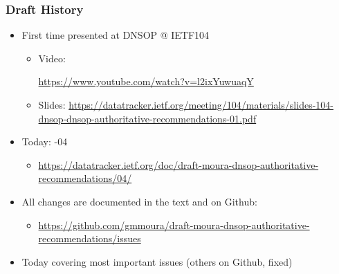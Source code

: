 \documentclass[11pt,show 
notes,notheorems,noamsthm,blank]{beamer} %
\begin{document}
\begin{frame}
\frametitle{Draft History}


\begin{itemize}


\item  First time presented at DNSOP  @ IETF104
    \begin{itemize}
     \item Video: \begin{tiny} \url{https://www.youtube.com/watch?v=l2ixYuwuaqY} \end{tiny}
     \item Slides: \tiny  \url{https://datatracker.ietf.org/meeting/104/materials/slides-104-dnsop-dnsop-authoritative-recommendations-01.pdf}
    \end{itemize}
    
\item Today: -04 
\begin{itemize}
 \item   \begin{tiny}  \url{https://datatracker.ietf.org/doc/draft-moura-dnsop-authoritative-recommendations/04/} \end{tiny}
\end{itemize}

\item All changes are documented in the text and on Github:
\begin{itemize}
 \item \begin{tiny}  \url{https://github.com/gmmoura/draft-moura-dnsop-authoritative-recommendations/issues} \end{tiny}
\end{itemize}


\item Today covering most important  issues (others on Github, fixed)




\end{itemize}
\end{frame}
\end{document}
